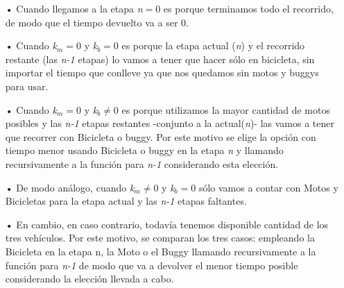 \begin{itemize}
\item[•]Cuando llegamos a la etapa \emph{n}$=0$ es porque terminamos todo el recorrido, de modo que el tiempo devuelto va a ser 0.

\item[•]Cuando \emph{k$_m$}$=0$ y \emph{k$_b$}$=0$ es porque la etapa actual (\emph{n}) y el recorrido restante (las \emph{n-1} etapas) lo vamos a tener que hacer s\'olo en bicicleta, sin importar el tiempo que conlleve ya que nos quedamos sin motos y buggys para usar.

\item[•]Cuando \emph{k$_m$}$=0$ y \emph{k$_b$}$\neq0$ es porque utilizamos la mayor cantidad de motos posibles y las \emph{n-1} etapas restantes -conjunto a la actual(\emph{n})- las vamos a tener que recorrer con Bicicleta o buggy. Por este motivo se elige la opci\'on con tiempo menor usando Bicicleta o buggy en la etapa \emph{n} y llamando recursivamente a la funci\'on para \emph{n-1} considerando esta elecci\'on.

\item[•]De modo an\'alogo, cuando \emph{k$_m$}$\neq0$ y \emph{k$_b$}$=0$ s\'olo vamos a contar con Motos y Bicicletas para la etapa actual y las \emph{n-1} etapas faltantes.

\item[•]En cambio, en caso contrario, todav\'ia tenemos disponible cantidad de los tres veh\'iculos. Por este motivo, se comparan los tres casos: empleando la Bicicleta en la etapa n, la Moto o el Buggy llamando recursivamente a la funci\'on para \emph{n-1} de modo que va a devolver el menor tiempo posible considerando la elecci\'on llevada a cabo.
\end{itemize}



